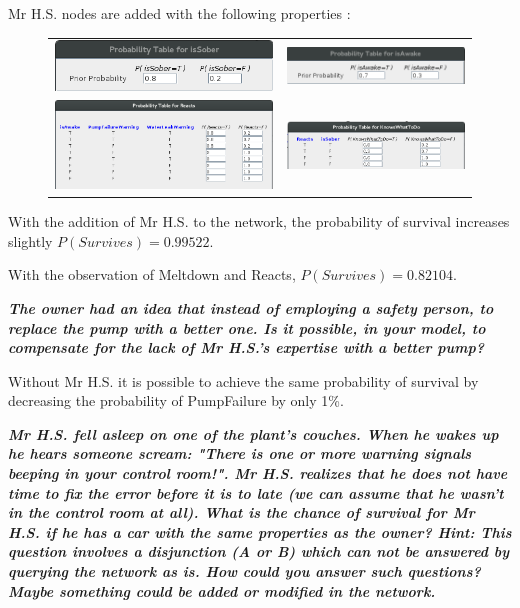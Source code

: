 Mr H.S. nodes are added with the following properties :

\begin{figure}[h]
    \centering
    \begin{tabular}{cc}
      \includegraphics[width=.45\linewidth,scale=1]{./images/i.png} &
\includegraphics[width=.45\linewidth, scale=1.5]{./images/a.png} \\
      \includegraphics[width=.45\linewidth,scale=1]{./images/r.png} &
\includegraphics[width=.45\linewidth, scale=1.5]{./images/k.png} \\
    \end{tabular}
\end{figure}

With the addition of Mr H.S. to the network, the probability of survival
increases slightly $P(Survives)=0.99522$.

With the observation of Meltdown and Reacts, $P(Survives)=0.82104$.

\textit{\textbf{The owner had an idea that instead of employing a safety person,
to replace the pump with a better one. Is it possible, in your model, to
compensate for the lack of Mr H.S.'s expertise with a better pump?}}

\vspace{1em}
Without Mr H.S. it is possible to achieve the same probability of survival by
decreasing the probability of PumpFailure by only 1\%.

\textit{\textbf{Mr H.S. fell asleep on one of the plant's couches.
 When he wakes up he hears someone scream: "There is one or more warning
 signals beeping in your control room!". Mr H.S. realizes that he does not
 have time to fix the error before it is to late (we can assume that he wasn't
  in the control room at all). What is the chance of survival for Mr H.S. if he
   has a car with the same properties as the owner? Hint: This question involves
    a disjunction (A or B) which can not be answered by querying the network
    as is. How could you answer such questions? Maybe something could be added
    or modified in the network.}}


